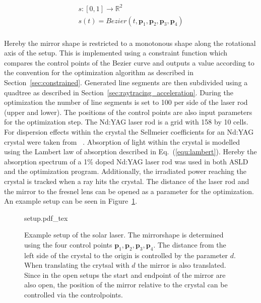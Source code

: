 \documentclass[a4paper,10pt]{article}
\renewcommand{\vec}[1]{\mathbf{#1}}
\newcommand{\equref}[1]{Eq.~(\ref{#1})}
\newcommand{\secref}[1]{Section~\ref{#1}}
\newcommand{\figref}[1]{Figure~\ref{#1}}
\begin{document}
    \begin{equation}
        \label{equ:mirror}
        \begin{gathered}
            s : [0,1] \rightarrow \mathbb{R}^2\\
            s(t) = Bezier(t, \vec{p}_1, \vec{p}_2, \vec{p}_3, \vec{p}_4)\\
        \end{gathered}
    \end{equation}

    Hereby the mirror shape is restricted to a monotonous shape
    along the rotational axis of the setup.
    This is implemented using a constraint function which compares
    the control points of the Bezier curve and outputs a 
    value according to the convention for the optimization algorithm as
    described in \secref{sec:constrained}.
    Generated line segments are then subdivided using a quadtree as described
    in \secref{sec:raytracing_acceleration}.
    During the optimization the number of line segments is set to 100
    per side of the laser rod (upper and lower).
    The positions of the control points are also input parameters
    for the optimization step.
    The Nd:YAG laser rod is a grid with 158 by 10 cells.
    For dispersion effects within the crystal the Sellmeier coefficients
    for an Nd:YAG crystal were taken from ~\cite{sellmeier_ndyag}.
    Absorption of light within the crystal is modelled using the Lambert
    law of absorption described in \equref{equ:lambert}.
    Hereby the absorption spectrum of a 1\% doped Nd:YAG laser
    rod was used in both ASLD and the optimization program.
    Additionally, the irradiated power reaching the crystal is
    tracked when a ray hits the crystal.
    The distance of the laser rod and the mirror to the
    fresnel lens can be opened as a parameter for the optimization.
    An example setup can be seen in \figref{fig:setup_example}.

    \begin{figure}
        \centering
        {setup.pdf_tex}
        \label{fig:setup_example}
        \caption[Example setup of the solar laser]{Example setup of the solar laser. The mirrorshape
        is determined using the four control points 
        $\vec{p}_1,\vec{p}_2,\vec{p}_3,\vec{p}_4$.
        The distance from the left side of the crystal to the origin
        is controlled by the parameter $d$.
        When translating the crytsal with $d$ the mirror is also translated.
        Since in the open setups the start and endpoint of the mirror are
        also open, the position of the mirror relative to the crystal
        can be controlled via the controlpoints.}
    \end{figure}
\end{document}
